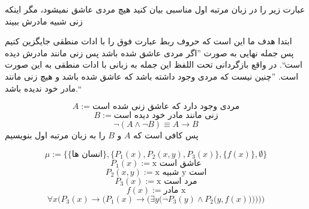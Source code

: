 عبارت زیر را در زبان مرتبه اول مناسبی بیان کنید
هیچ مردی عاشق نمیشود، مگر اینکه زنی شبیه مادرش ببیند
\begin{ans}
	ابتدا هدف ما این است که حروف ربط عبارت فوق را با ادات منطقی جایگزین کنیم پس جمله نهایی به صورت ''اگر مردی عاشق شده باشد پس زنی مانند مادرش دیده است``. در واقع بازگردانی تحت اللفظ این جمله به زبانی با ادات منطقی به این صورت است. ''چنین نیست که مردی وجود داشته باشد که عاشق شده باشد و هیچ زنی مانند مادر خود ندیده باشد.``
	
		$$
		A := \text{مردی وجود دارد که عاشق زنی شده است}
		$$
		$$
		B := \text{زنی مانند مادر خود دیده است}
		$$
		$$
		\neg (A \wedge \neg B) \equiv A \rightarrow {B}
		$$
		پس کافی است که $A$ و $B$ را به زبان مرتبه اول بنویسیم	
		
		$$
			\mathcal{\mu} := \{\{\text{انسان ها}\}, \{P_1(x), P_2(x, y), P_3(x)\}, \{f(x)\}, \emptyset\}
		$$
		$$
			{P_1}(x) := \text{x عاشق است}
		$$
		$$
			{P_2}(x, y) := \text{x شبیه y است}
		$$
		$$
			{P_3}(x) := \text{x مرد است}
		$$
		$$
			f(x) := \text{مادر x}
		$$
		$$
			\forall x \Big({P_3}(x) \rightarrow \Big({{P_1}(x) \rightarrow \Big({\exists y \Big(\neg {P_3}(y) \wedge {P_2}\Big(y, f(x)\Big)\Big)}}\Big)  \Big)\Big)
		$$
		
	
\end{ans}
